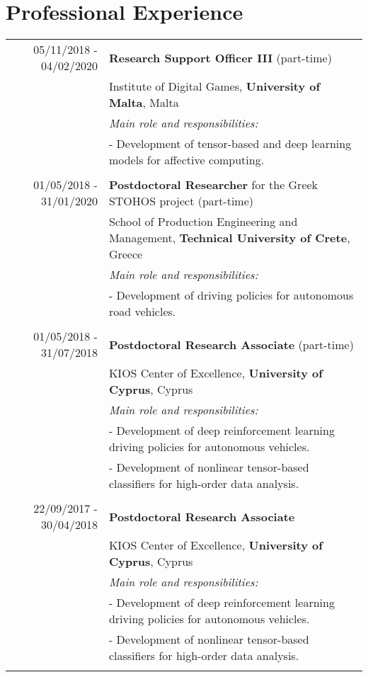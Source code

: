 \documentclass[a4paper,10pt]{article}
\begin{document}
\section{Professional Experience}
\begin{longtable}{r|p{11cm}}	
	05/11/2018 - 04/02/2020 & \textbf{Research Support Officer III} (part-time)\\
	& Institute of Digital Games, \textbf{University of Malta}, Malta\\
	& \textit{\small{Main role and responsibilities:}} \\
	&\footnotesize{- Development of tensor-based and deep learning models for affective computing.}\\
	\multicolumn{2}{c}{} \\		
	
	01/05/2018 - 31/01/2020 & \textbf{Postdoctoral Researcher} for the Greek STOHOS project (part-time) \\
	& School of Production Engineering and Management, \textbf{Technical University of Crete}, Greece\\
	& \textit{\small{Main role and responsibilities:}} \\
	&\footnotesize{- Development of driving policies for autonomous road vehicles.}\\
	\multicolumn{2}{c}{} \\	
	
	01/05/2018 - 31/07/2018 & \textbf{Postdoctoral Research Associate} (part-time) \\
	& KIOS Center of Excellence, \textbf{University of Cyprus}, Cyprus\\
	& \textit{\small{Main role and responsibilities:}} \\
	&\footnotesize{- Development of deep reinforcement learning driving policies for autonomous vehicles.}\\
	&\footnotesize{- Development of nonlinear tensor-based classifiers for high-order data analysis.}\\
	\multicolumn{2}{c}{} \\	
	
	22/09/2017 - 30/04/2018 & \textbf{Postdoctoral Research Associate} \\
	& KIOS Center of Excellence, \textbf{University of Cyprus}, Cyprus\\
	& \textit{\small{Main role and responsibilities:}} \\
	&\footnotesize{- Development of deep reinforcement learning driving policies for autonomous vehicles.}\\
	&\footnotesize{- Development of nonlinear tensor-based classifiers for high-order data analysis.}\\
	\multicolumn{2}{c}{} \\	
	

\end{longtable}
\end{document}

